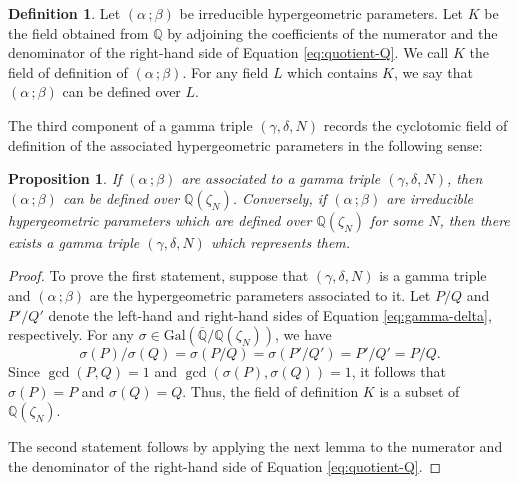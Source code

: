 \documentclass[11pt, reqno]{amsart}
\theoremstyle{plain}
\newtheorem{prop}[theo]{Proposition}
\theoremstyle{definition}
\newtheorem{defi}[theo]{Definition}
\newcommand{\Q}{\mathbb{Q}}
\newcommand{\ga}{\gamma}
\newcommand{\be}{\beta}
\newcommand{\al}{\alpha}
\newcommand{\Gal}{\text{Gal}}
\begin{document}
\begin{defi}
    Let $(\al\,;\be)$ be irreducible hypergeometric parameters. Let $K$ be the field obtained from $\Q$ by adjoining the coefficients of the numerator and the denominator of the right-hand side of Equation \eqref{eq:quotient-Q}. We call $K$ the field of definition of $(\al \, ; \be)$.
    For any field $L$ which contains $K$, we say that $(\al \, ; \be)$ can be defined over $L$.
\end{defi}

The third component of a gamma triple $(\gamma, \delta, N)$ records the cyclotomic field of definition of the associated hypergeometric parameters in the following sense:

\begin{prop}\label{prop:extension-field-field-of-definition}
If $(\al \,;\be)$ are associated to a gamma triple $(\gamma,\delta,N)$, then $(\al \,;\be)$ can be defined over $\Q(\zeta_N)$.  Conversely, if $(\al \,;\be)$ are irreducible hypergeometric parameters which are defined over $\Q(\zeta_N)$ for some $N$, then there exists a gamma triple $(\gamma,\delta,N)$ which represents them.
\end{prop}

\begin{proof}
To prove the first statement, suppose that $(\ga,\delta,N)$ is a gamma triple and $(\al \, ; \be)$ are the hypergeometric parameters associated to it. Let $P/Q$ and $P'/Q'$ denote the left-hand and right-hand sides of Equation \eqref{eq:gamma-delta}, respectively. For any $\sigma \in \Gal(\overline{\Q}/\Q(\zeta_N))$, we have
\[
\sigma(P)/\sigma(Q)=\sigma(P/Q) = \sigma(P'/Q') = P'/Q' = P/Q.
\]
Since $\gcd(P, Q) = 1$ and $\gcd(\sigma(P), \sigma(Q)) = 1$, it follows that $\sigma(P) = P$ and $\sigma(Q) = Q$. Thus, the field of definition $K$ is a subset of $\Q(\zeta_N)$.

The second statement follows by applying the next lemma to the numerator and the denominator of the right-hand side of Equation \eqref{eq:quotient-Q}.
\end{proof}
\end{document}
